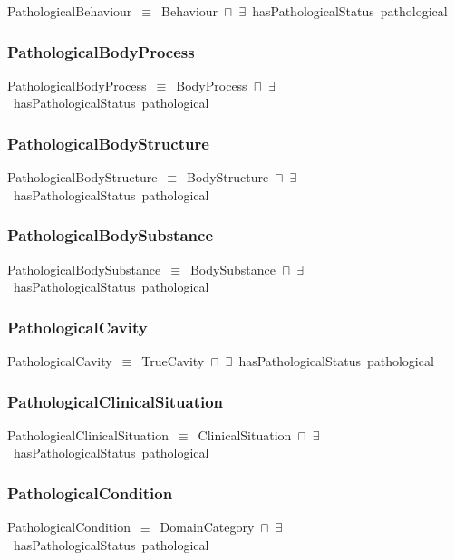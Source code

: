 \documentclass{article}
\begin{document}
PathologicalBehaviour~\ensuremath{\equiv}~Behaviour~\ensuremath{\sqcap}~\ensuremath{\exists}~hasPathologicalStatus~pathological

\subsubsection*{PathologicalBodyProcess}

PathologicalBodyProcess~\ensuremath{\equiv}~BodyProcess~\ensuremath{\sqcap}~\ensuremath{\exists}~hasPathologicalStatus~pathological

\subsubsection*{PathologicalBodyStructure}

PathologicalBodyStructure~\ensuremath{\equiv}~BodyStructure~\ensuremath{\sqcap}~\ensuremath{\exists}~hasPathologicalStatus~pathological

\subsubsection*{PathologicalBodySubstance}

PathologicalBodySubstance~\ensuremath{\equiv}~BodySubstance~\ensuremath{\sqcap}~\ensuremath{\exists}~hasPathologicalStatus~pathological

\subsubsection*{PathologicalCavity}

PathologicalCavity~\ensuremath{\equiv}~TrueCavity~\ensuremath{\sqcap}~\ensuremath{\exists}~hasPathologicalStatus~pathological

\subsubsection*{PathologicalClinicalSituation}

PathologicalClinicalSituation~\ensuremath{\equiv}~ClinicalSituation~\ensuremath{\sqcap}~\ensuremath{\exists}~hasPathologicalStatus~pathological

\subsubsection*{PathologicalCondition}

PathologicalCondition~\ensuremath{\equiv}~DomainCategory~\ensuremath{\sqcap}~\ensuremath{\exists}~hasPathologicalStatus~pathological
\end{document}
